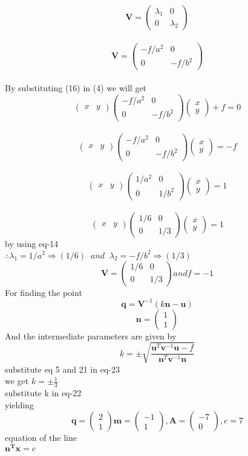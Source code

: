 \documentclass[10pt, a4paper]{article}
\newcommand{\myvec}[1]{\ensuremath{\begin{pmatrix}#1\end{pmatrix}}}
\let\vec\mathbf
\begin{document}
\begin{equation}
\vec{V}=\myvec{\lambda_1&0\\0&\lambda_2}
\end{equation}\\
\begin{equation}
\vec{V}=\myvec{-f/a^2&0\\0&-f/b^2}
\end{equation}\\
By substituting (16) in (4) we will get\\
\begin{equation}
\myvec{x&y}\myvec{-f/a^2&0\\0&-f/b^2}\myvec{x\\y}+f=0
\end{equation}\\
\begin{equation}
\myvec{x&y}\myvec{-f/a^2&0\\0&-f/b^2}\myvec{x\\y}=-f
\end{equation}\\
\begin{equation}
\myvec{x&y}\myvec{1/a^2&0\\0&1/b^2}\myvec{x\\y}=1
\end{equation}\\
\begin{equation}
\myvec{x&y}\myvec{1/6&0\\0&1/3}\myvec{x\\y}=1
\end{equation}
by using eq-14\\
$\therefore\lambda_1=1/a^2 \Rightarrow(1/6)\;\;and\;\;\lambda_2=-f/b^2 \Rightarrow(1/3)$
\begin{equation}
\vec{V}=\myvec{1/6&0\\0&1/3} and f=-1
\end{equation}
 For finding the point \\
\begin{equation}
\vec{q}=\vec{V}^{-1}(k\vec{n}-\vec{u})
\end{equation}
\begin{equation}
\vec{n}=\myvec{1\\1}
\end{equation}
And the intermediate parameters are given by\\
\begin{equation}
k=\pm\sqrt{\frac{\vec{u}^T\vec{v}^{-1}\vec{u}-f}{\vec{n}^T\vec{v}^{-1}\vec{n}}}
\end{equation}
substitute eq 5 and 21 in eq-23\\
we get $k=\pm\frac{1}{3}$\\
substitute k in eq-22 \\
yielding\\
\begin{equation}
\vec{q}=\myvec{2\\1}  \vec{m}=\myvec{-1\\1}, \vec{A}=\myvec{-7\\0},c=7
\end{equation}
equation of the line\\
$\vec{n^T}\vec{x}=c$
\end{document}
